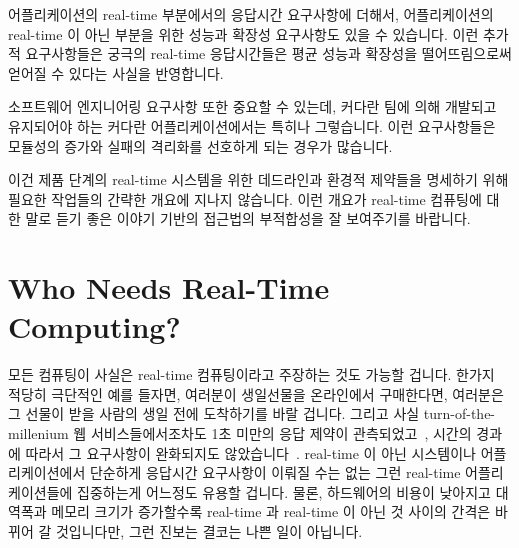 어플리케이션의 real-time 부분에서의 응답시간 요구사항에 더해서, 어플리케이션의
real-time 이 아닌 부분을 위한 성능과 확장성 요구사항도 있을 수 있습니다.
이런 추가적 요구사항들은 궁극의 real-time 응답시간들은 평균 성능과 확장성을
떨어뜨림으로써 얻어질 수 있다는 사실을 반영합니다.

소프트웨어 엔지니어링 요구사항 또한 중요할 수 있는데, 커다란 팀에 의해 개발되고
유지되어야 하는 커다란 어플리케이션에서는 특히나 그렇습니다.
이런 요구사항들은 모듈성의 증가와 실패의 격리화를 선호하게 되는 경우가
많습니다.

이건 제품 단계의 real-time 시스템을 위한 데드라인과 환경적 제약들을 명세하기
위해 필요한 작업들의 간략한 개요에 지나지 않습니다.
이런 개요가 real-time 컴퓨팅에 대한 말로 듣기 좋은 이야기 기반의 접근법의
부적합성을 잘 보여주기를 바랍니다.

\section{Who Needs Real-Time Computing?}
\label{sec:rt:Who Needs Real-Time Computing?}

모든 컴퓨팅이 사실은 real-time 컴퓨팅이라고 주장하는 것도 가능할 겁니다.
한가지 적당히 극단적인 예를 들자면, 여러분이 생일선물을 온라인에서 구매한다면,
여러분은 그 선물이 받을 사람의 생일 전에 도착하기를 바랄 겁니다.
그리고 사실 turn-of-the-millenium 웹 서비스들에서조차도 1초 미만의 응답 제약이
관측되었고~\cite{KristofferBohmann2001a}, 시간의 경과에 따라서 그 요구사항이
완화되지도 않았습니다~\cite{DeCandia:2007:DAH:1323293.1294281}.
real-time 이 아닌 시스템이나 어플리케이션에서 단순하게 응답시간 요구사항이
이뤄질 수는 없는 그런 real-time 어플리케이션들에 집중하는게 어느정도 유용할
겁니다.
물론, 하드웨어의 비용이 낮아지고 대역폭과 메모리 크기가 증가할수록 real-time 과
real-time 이 아닌 것 사이의 간격은 바뀌어 갈 것입니다만, 그런 진보는 결코는
나쁜 일이 아닙니다.
\iffalse

